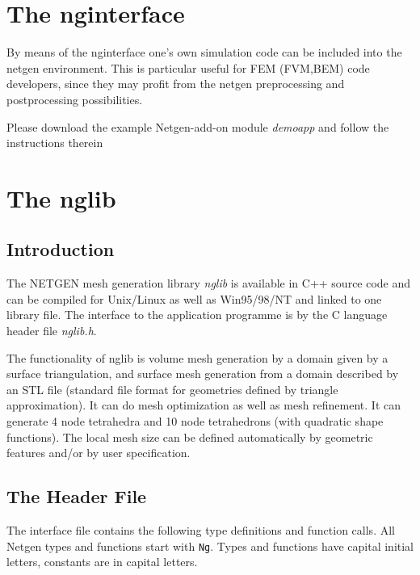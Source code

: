 \documentclass[12pt]{book}
\begin{document}
\section{The nginterface}
By means of the nginterface one's own simulation code can be 
included into the netgen environment. This is particular useful
for FEM (FVM,BEM) code developers, since they may profit from the
netgen preprocessing and postprocessing possibilities. 

Please download the example Netgen-add-on module {\it demoapp} and
follow the instructions therein

\section{The nglib}


\subsection{Introduction}
The NETGEN mesh generation library {\it nglib} is available in C++
source code and can be compiled for Unix/Linux as well as Win95/98/NT
and linked to one library file. The interface to the application
programme is by the C language header file {\it nglib.h}.

The functionality of nglib is volume mesh generation by a domain given 
by a surface triangulation, and surface mesh generation from a domain 
described by an STL file (standard file format for geometries defined by
triangle approximation). It can do mesh optimization as well as mesh 
refinement. It can generate 4 node tetrahedra and 10 node tetrahedrons
(with quadratic shape functions). The local mesh size can be defined 
automatically by geometric features and/or by user specification.


\subsection{The Header File}

The interface file contains the following type definitions and function
calls. All Netgen types and functions start with {\tt Ng}. Types and
functions have capital initial letters, constants are in capital letters.
\end{document}
